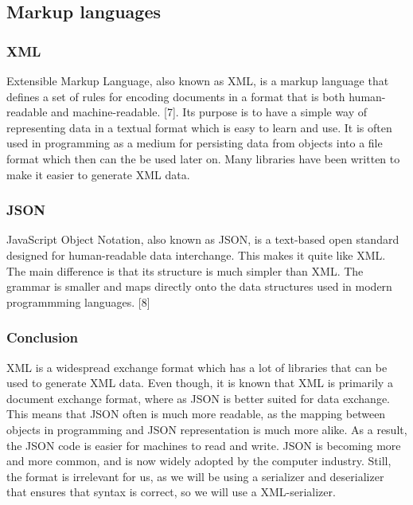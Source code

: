 \subsection{Markup languages}

\subsubsection{XML}
Extensible Markup Language, also known as XML, is a markup language that defines a set of rules for encoding documents in a format that is both human-readable and machine-readable.  [7]. Its purpose is to have a simple way of representing data in a textual format which is easy to learn and use. It is often used in programming as a medium for persisting data from objects into a file format which then can the be used later on. Many libraries have been written to make it easier to generate XML data.

\subsubsection{JSON}
JavaScript Object Notation, also known as JSON, is a text-based open standard designed for human-readable data interchange. This makes it quite like XML. The main difference is that its structure is much simpler than XML. The grammar is smaller and maps directly onto the data structures used in modern programmming languages. [8]

\subsubsection{Conclusion}
XML is a widespread exchange format which has a lot of libraries that can be used to generate XML data. Even though, it is known that XML is primarily a document exchange format, where as JSON is better suited for data exchange. This means that JSON often is much more readable, as the mapping between objects in programming and JSON representation is much more alike. As a result, the JSON code is easier for machines to read and write. JSON is becoming more and more common, and is now widely adopted by the computer industry. Still, the format is irrelevant for us, as we will be using a serializer and deserializer that ensures that syntax is correct, so we will use a XML-serializer. 
